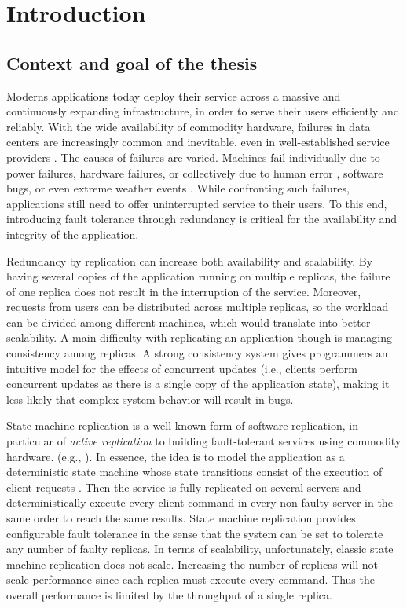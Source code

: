 \chapter[Introduction]{Introduction}

\section{Context and goal of the thesis}

Moderns applications today deploy their service across a massive and
continuously expanding infrastructure, in order to serve their users efficiently
and reliably. With the wide availability of commodity hardware, failures in data
centers are increasingly common and inevitable, even in well-established service
providers \citep{disruption:google}. The causes of failures are varied. Machines
fail individually due to power failures, hardware failures, or collectively due
to human error \citep{disruption:amazon}, software bugs, or even extreme weather
events \citep{disruption:weather}. While confronting such failures, applications
still need to offer uninterrupted service to their users. To this end,
introducing fault tolerance through redundancy is critical for the availability
and integrity of the application.

Redundancy by replication can increase both availability and scalability. By
having several copies of the application running on multiple replicas, the
failure of one replica does not result in the interruption of the service.
Moreover, requests from users can be distributed across multiple replicas, so
the workload can be divided among different machines, which would translate into
better scalability. A main difficulty with replicating an application though is
managing consistency among replicas. A strong consistency system gives
programmers an intuitive model for the effects of concurrent updates (i.e.,
clients perform concurrent updates as there is a single copy of the application
state), making it less likely that complex system behavior will result in bugs.

State-machine replication is a well-known form of software replication, in
particular of \emph{active replication} to building fault-tolerant services
using commodity hardware. (e.g.,
\cite{Shvachko:2003,Ghemawat:2003,Burrows:2006,MacCormick:2004}). In essence,
the idea is to model the application as a deterministic state machine whose
state transitions consist of the execution of client requests \cite{Lam78,
Sch90}. Then the service is fully replicated on several servers and
deterministically execute every client command in every non-faulty server in the
same order to reach the same results. State machine replication provides
configurable fault tolerance in the sense that the system can be set to tolerate
any number of faulty replicas. In terms of scalability, unfortunately, classic
state machine replication does not scale. Increasing the number of replicas will
not scale performance since each replica must execute every command. Thus the
overall performance is limited by the throughput of a single replica.

